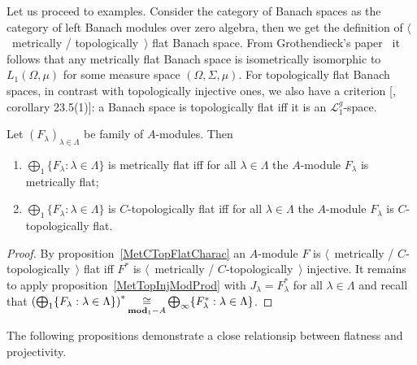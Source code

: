 Let us proceed to examples. Consider the category of Banach spaces as 
the category of left Banach modules over zero algebra, then we get the 
definition of $\langle$~metrically / topologically~$\rangle$ flat Banach space. 
From Grothendieck's paper~\cite{GrothMetrProjFlatBanSp} it follows that any 
metrically flat Banach space is isometrically isomorphic to $L_1(\Omega,\mu)$ 
for some measure space $(\Omega,\Sigma,\mu)$. For topologically flat Banach 
spaces, in contrast with topologically injective ones, we also have a criterion
[\cite{DefFloTensNorOpId}, corollary 23.5(1)]: a Banach space is topologically
flat iff it is an $\mathscr{L}_1^g$-space.

\begin{proposition}\label{MetTopFlatModCoProd} Let
${(F_\lambda)}_{\lambda\in\Lambda}$ be family of $A$-modules. Then 

\begin{enumerate}[label = (\roman*)]
    \item $\bigoplus_1 \{F_\lambda:\lambda\in\Lambda \}$ is metrically flat iff
    for all $\lambda\in\Lambda$ the $A$-module $F_\lambda$ is metrically flat;

    \item $\bigoplus_1 \{F_\lambda:\lambda\in\Lambda \}$ is $C$-topologically
    flat iff for all $\lambda\in\Lambda$ the $A$-module $F_\lambda$ is
    $C$-topologically flat.
\end{enumerate}
\end{proposition}
\begin{proof} By proposition~\ref{MetCTopFlatCharac} an $A$-module $F$ 
is $\langle$~metrically / $C$-topologically~$\rangle$ flat iff $F^*$ 
is $\langle$~metrically / $C$-topologically~$\rangle$ injective. 
It remains to apply
proposition~\ref{MetTopInjModProd} with $J_\lambda=F_\lambda^*$ for all
$\lambda\in\Lambda$ and recall that 
${\left(\bigoplus_1 \{
    F_\lambda:\lambda\in\Lambda \}
\right)}^*
\mathop{\mathbin{\cong}}\limits_{\mathbf{mod}_1-A}
\bigoplus_\infty \{ F_\lambda^*:\lambda\in\Lambda \}$.
\end{proof}

The following propositions demonstrate a close relationsip between flatness and
projectivity.


